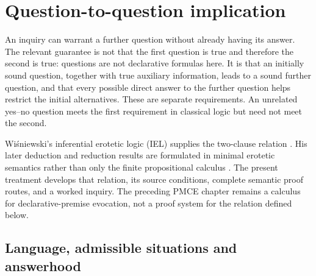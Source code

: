\section{Question-to-question implication}
\label{sec:p18-question-to-question-implication}

An inquiry can warrant a further question without already having its answer.
The relevant guarantee is not that the first question is true and therefore
the second is true: questions are not declarative formulas here. It is that
an initially sound question, together with true auxiliary information, leads
to a sound further question, and that every possible direct answer to the
further question helps restrict the initial alternatives. These are separate
requirements. An unrelated yes--no question meets the first requirement in
classical logic but need not meet the second.

Wi\'sniewski's inferential erotetic logic (IEL) supplies the two-clause relation
\cite[secs.~3--4,7]{Wisniewski2001QuestionsInferences}. His later deduction and
reduction results are formulated in minimal erotetic semantics rather than
only the finite propositional calculus \cite{Wisniewski2018DeductionReduction}.
The present treatment develops that relation, its source conditions, complete
semantic proof routes, and a worked inquiry. The preceding PMCE chapter
remains a calculus for declarative-premise evocation, not a proof system for
the relation defined below.

\subsection{Language, admissible situations and answerhood}

